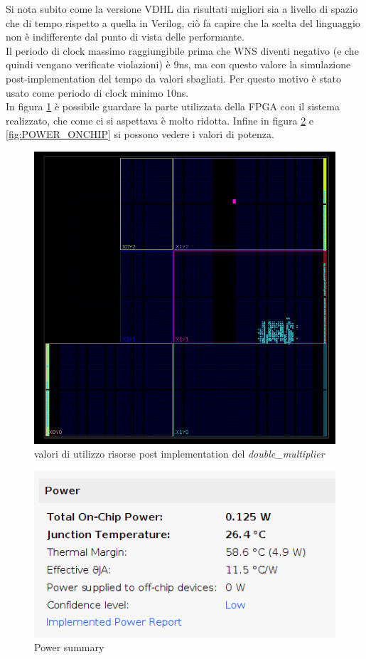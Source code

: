 \documentclass[]{IEEEtran}
\begin{document}
Si nota subito come la versione VDHL dia risultati migliori sia a livello di spazio che di tempo rispetto a quella in Verilog, ciò fa capire che la scelta del linguaggio non è indifferente dal punto di vista delle performante.
\\Il periodo di clock massimo raggiungibile prima che WNS diventi negativo (e che quindi vengano verificate violazioni) è 9ns, ma con questo valore la simulazione post-implementation del tempo da valori sbagliati. Per questo motivo è stato usato come periodo di clock minimo 10ns.
\\In figura \ref{fig:DEVICE} è possibile guardare la parte utilizzata della FPGA con il sistema realizzato, che come ci si aspettava è molto ridotta. Infine in figura \ref{fig:POWER_SUMMARY} e \ref{fig:POWER_ONCHIP} si possono vedere i valori di potenza.
\begin{figure}[!htb]
    \centering
    \includegraphics[width=0.9\linewidth]{figures/device_impl}
    \caption{valori di utilizzo risorse post implementation del \textit{double\_multiplier}}
    \label{fig:DEVICE}
\end{figure}
\begin{figure}[!htb]
    \centering
    \includegraphics[width=0.9\linewidth]{figures/power_summary}
    \caption{Power summary}
    \label{fig:POWER_SUMMARY}
\end{figure}
\end{document}
